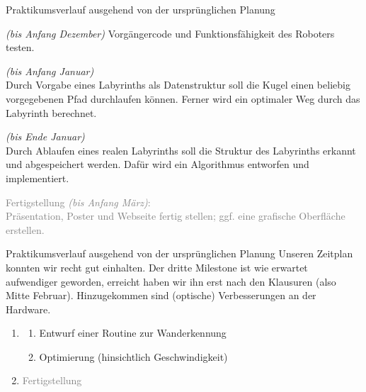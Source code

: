 \documentclass{beamer}
\begin{document}
\begin{frame}[fragile,t]{Praktikumsverlauf ausgehend von der ursprünglichen Planung}

\smallskip
\begin{enumerate}
 \item {} \textit{(bis Anfang Dezember)}\blue{:} Vorgängercode und Funktionsfähigkeit des Roboters testen.
 \item {} \textit{(bis Anfang Januar)}\blue{:}\\
 Durch Vorgabe eines Labyrinths als Datenstruktur soll die Kugel einen beliebig vorgegebenen Pfad durchlaufen können. Ferner wird ein optimaler Weg durch das Labyrinth berechnet.
 \item {} \textit{(bis Ende Januar)}\blue{:}\\
 Durch Ablaufen eines realen Labyrinths soll die Struktur des Labyrinths erkannt und abgespeichert werden. Dafür wird ein Algorithmus entworfen und implementiert.
 \textcolor{gray}{
 \item[\textcolor{gray}{4.}] Fertigstellung \textit{(bis Anfang März)}:\\
Präsentation, Poster und Webseite fertig stellen; ggf. eine grafische Oberfläche erstellen.
}
\end{enumerate}
\end{frame}

\begin{frame}[fragile,t]{Praktikumsverlauf ausgehend von der ursprünglichen Planung}
Unseren Zeitplan konnten wir recht gut einhalten. Der dritte Milestone ist wie erwartet aufwendiger geworden, erreicht haben wir ihn erst nach den Klausuren (also Mitte Februar). Hinzugekommen sind (optische) Verbesserungen an der Hardware. 

\smallskip
\begin{enumerate}
 \item[3.] 
 \begin{enumerate}
 \item[(a)] Entwurf einer Routine zur Wanderkennung
 \item[(b)] Optimierung (hinsichtlich Geschwindigkeit)
 \end{enumerate}
 \item[\textcolor{gray}{4.}] \textcolor{gray}{Fertigstellung}
\end{enumerate}
\end{frame}
\end{document}
